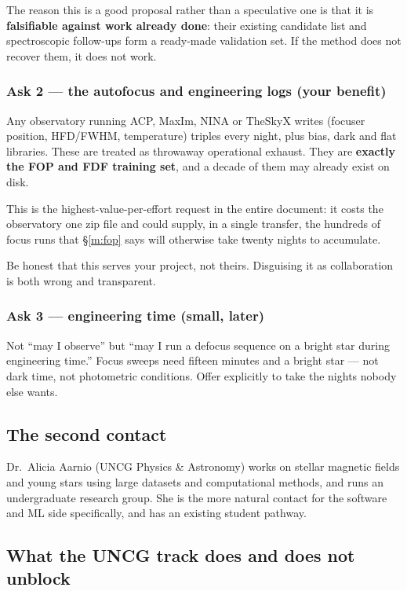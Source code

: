 \documentclass[11pt]{article}
\begin{document}
The reason this is a good proposal rather than a speculative one is that it is
\textbf{falsifiable against work already done}: their existing candidate list
and spectroscopic follow-ups form a ready-made validation set. If the method
does not recover them, it does not work.

\subsubsection*{Ask 2 --- the autofocus and engineering logs (your benefit)}

Any observatory running ACP, MaxIm, NINA or TheSkyX writes
(focuser position, HFD/FWHM, temperature) triples every night, plus bias, dark
and flat libraries. These are treated as throwaway operational exhaust. They are
\textbf{exactly the FOP and FDF training set}, and a decade of them may already
exist on disk.

This is the highest-value-per-effort request in the entire document: it costs
the observatory one zip file and could supply, in a single transfer, the
hundreds of focus runs that \S\ref{m:fop} says will otherwise take twenty
nights to accumulate.

Be honest that this serves your project, not theirs. Disguising it as
collaboration is both wrong and transparent.

\subsubsection*{Ask 3 --- engineering time (small, later)}

Not ``may I observe'' but ``may I run a defocus sequence on a bright star during
engineering time.'' Focus sweeps need fifteen minutes and a bright star --- not
dark time, not photometric conditions. Offer explicitly to take the nights
nobody else wants.

\subsection{The second contact}

Dr.\ Alicia Aarnio (UNCG Physics \& Astronomy) works on stellar magnetic fields
and young stars using large datasets and computational methods, and runs an
undergraduate research group. She is the more natural contact for the
software and ML side specifically, and has an existing student pathway.

\subsection{What the UNCG track does and does not unblock}
\end{document}
